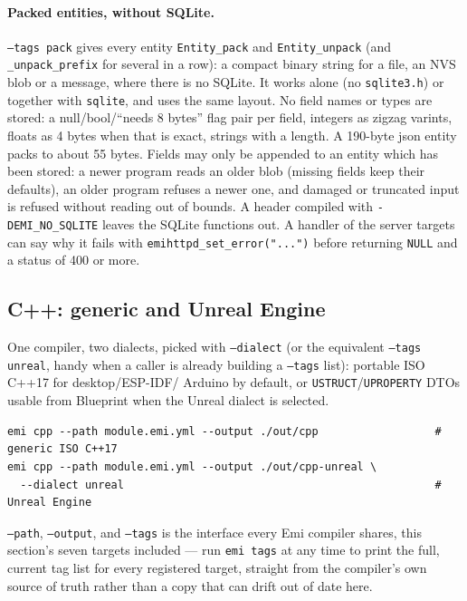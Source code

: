 \paragraph{Packed entities, without SQLite.} \texttt{--tags pack} gives every entity
\texttt{Entity\_pack} and \texttt{Entity\_unpack} (and \texttt{\_unpack\_prefix} for several in a row): a
compact binary string for a file, an NVS blob or a message, where there is no SQLite. It works alone
(no \texttt{sqlite3.h}) or together with \texttt{sqlite}, and uses the same layout. No field names or
types are stored: a null/bool/``needs 8 bytes'' flag pair per field, integers as zigzag varints, floats
as 4 bytes when that is exact, strings with a length. A 190-byte json entity packs to about 55 bytes.
Fields may only be appended to an entity which has been stored: a newer program reads an older blob
(missing fields keep their defaults), an older program refuses a newer one, and damaged or truncated input
is refused without reading out of bounds. A header compiled with \texttt{-DEMI\_NO\_SQLITE} leaves the
SQLite functions out. A handler of the server targets can say why it fails with
\texttt{emihttpd\_set\_error("...")} before returning \texttt{NULL} and a status of 400 or more.

\subsection{C++: generic and Unreal Engine}
One compiler, two dialects, picked with \texttt{--dialect} (or the
equivalent \texttt{--tags unreal}, handy when a caller is already
building a \texttt{--tags} list): portable ISO C++17 for desktop/ESP-IDF/
Arduino by default, or \texttt{USTRUCT}/\texttt{UPROPERTY} DTOs usable
from Blueprint when the Unreal dialect is selected.
\begin{lstlisting}
emi cpp --path module.emi.yml --output ./out/cpp                  # generic ISO C++17
emi cpp --path module.emi.yml --output ./out/cpp-unreal \
  --dialect unreal                                                # Unreal Engine
\end{lstlisting}

\begin{pullquote}
\texttt{--path}, \texttt{--output}, and \texttt{--tags} is the interface
every Emi compiler shares, this section's seven targets included --- run
\texttt{emi tags} at any time to print the full, current tag list for
every registered target, straight from the compiler's own source of
truth rather than a copy that can drift out of date here.
\end{pullquote}
